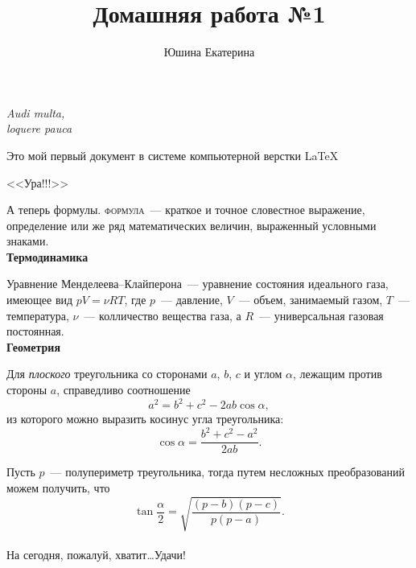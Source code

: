 \documentclass[12pt]{article}
\title{Домашняя работа №1}
\author{Юшина Екатерина}
\date{}
\renewcommand{\tg}{\tan}
\begin{document}
	\maketitle
	\begin{flushright}
	    \textit{Audi multa, \\loquere pauca}
	\end{flushright}
	\par
	\vspace{20pt}
	Это мой первый документ в системе компьютерной верстки \LaTeX \\
	\begin{center}
	    {\Huge\textsf{<<Ура!!!>>}}
	\end{center}
    \par
	А теперь формулы. \textsc{формула}~--- краткое и точное словестное выражение, определение или же ряд математических величин, выраженный условными знаками.\\[15pt]
	
	\hspace{28pt} {\LARGE\textbf{Термодинамика}} \par
	Уравнение Менделеева--Клайперона~--- уравнение состояния идеального газа, имеющее вид $ pV = \nu RT $, где $p$~--- давление, $V$~--- объем, занимаемый газом, $T$~--- температура, $\nu$~--- колличество вещества газа, а $R$~--- универсальная газовая постоянная.\\[15pt]
	
	\hspace{28pt} {\LARGE\textbf{Геометрия }} \par
	Для \textsl{плоского} треугольника со сторонами $a$, $b$, $c$ и углом $\alpha$, лежащим против стороны $a$, справедливо соотношение
	$$
	    a^2 = b^2 + c^2 - 2ab \cos\alpha,
	$$
	из которого можно выразить косинус угла треугольника:
	$$
	    \cos\alpha = \frac{b^2 + c^2 - a^2}{2ab}.
	$$ \par
	Пусть $p$~--- полупериметр треугольника, тогда путем несложных преобразований можем получить, что
	$$
	    \tg\frac{\alpha}{2} = \sqrt{\frac{(p - b)(p - c)}{p(p - a)}}.
	$$
	\\[1cm] 
	На сегодня, пожалуй, хватит\dots Удачи!
\end{document}

